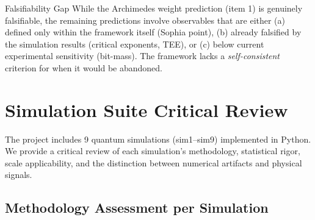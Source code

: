 \documentclass[11pt,a4paper]{article}
\begin{document}
\begin{warnbox}{Falsifiability Gap}
While the Archimedes weight prediction (item 1) is genuinely falsifiable, the remaining predictions involve observables that are either (a) defined only within the framework itself (Sophia point), (b) already falsified by the simulation results (critical exponents, TEE), or (c) below current experimental sensitivity (bit-mass). The framework lacks a \textit{self-consistent} criterion for when it would be abandoned.
\end{warnbox}

\section{Simulation Suite Critical Review}

The project includes 9 quantum simulations (sim1--sim9) implemented in Python. We provide a critical review of each simulation's methodology, statistical rigor, scale applicability, and the distinction between numerical artifacts and physical signals.

\subsection{Methodology Assessment per Simulation}
\end{document}
